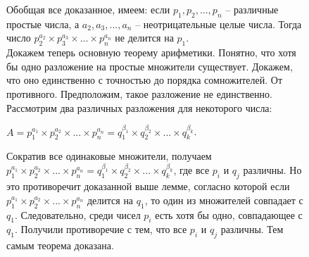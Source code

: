 \begin{figure}[H]
\begin{minipage}{0.7\linewidth}
    Обобщая все доказанное, имеем: если $p_1, p_2, ..., p_n$ -- различные простые числа, а $a_2, a_3, ..., a_n$ -- неотрицательные целые числа. Тогда число $p_2^{a_2} \times p_3^{a_3} \times ... \times p_n^{a_n}$ не делится на $p_1$.
    \\
    Докажем теперь основную теорему арифметики. Понятно, что хотя бы одно разложение на простые множители существует. Докажем, что оно единственно с точностью до порядка сомножителей. От противного. Предположим, такое разложение не единственно. Рассмотрим два различных разложения для некоторого числа:  
    \begin{center}
       $A = p_1^{a_1} \times p_2^{a_2} \times ... \times p_n^{a_n} = q_1^{\beta_1} \times q_2^{\beta_2} \times ... \times q_k^{\beta_k}$. 
    \end{center}
    Сократив все одинаковые множители, получаем $p_1^{a_1} \times p_2^{a_2} \times ... \times p_n^{a_n} = q_1^{\beta_1} \times q_2^{\beta_2} \times ... \times q_k^{\beta_k}$, где все $p_i$ и $q_j$ различны. Но это противоречит доказанной выше лемме, согласно которой если $p_1^{a_1} \times p_2^{a_2} \times ... \times p_n^{a_n}$ делится на $q_1$, то один из множителей совпадает с $q_1$. Следовательно, среди чисел $p_i$ есть хотя бы одно, совпадающее с $q_1$. Получили противоречие с тем, что все $p_i$ и $q_j$ различны. Тем самым теорема доказана.
\end{minipage}
    \hfill
\begin{minipage}{0.29\linewidth}

\end{minipage}
\end{figure}
